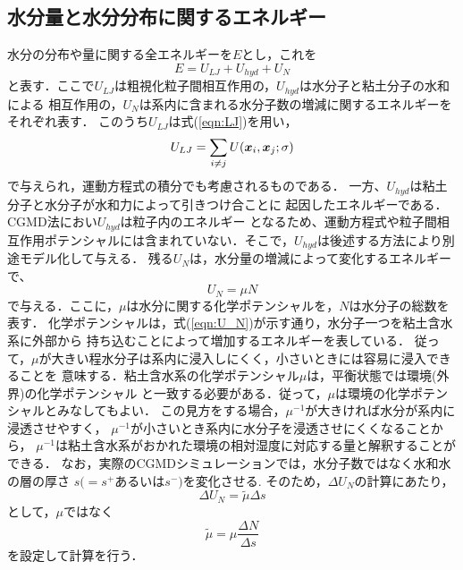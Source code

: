 \subsection{水分量と水分分布に関するエネルギー}
水分の分布や量に関する全エネルギーを$E$とし，これを
\begin{equation}
	E=U_{LJ} +U_{hyd} + U_N
	\label{eqn:}
\end{equation}
と表す．ここで$U_{LJ}$は粗視化粒子間相互作用の，$U_{hyd}$は水分子と粘土分子の水和による
相互作用の，$U_N$は系内に含まれる水分子数の増減に関するエネルギーをそれぞれ表す．
このうち$U_{LJ}$は式(\ref{eqn:LJ})を用い，
\begin{equation}
	U_{LJ}=\sum_{i\neq j} U(\mbox{\boldmath $x$}_i,\mbox{\boldmath $x$}_j;\sigma)
	\label{eqn:}
\end{equation}
で与えられ，運動方程式の積分でも考慮されるものである．
一方、$U_{hyd}$は粘土分子と水分子が水和力によって引きつけ合ことに
起因したエネルギーである．CGMD法におい$U_{hyd}$は粒子内のエネルギー
となるため、運動方程式や粒子間相互作用ポテンシャルには含まれていない．そこで，$U_{hyd}$は後述する方法により別途モデル化して与える．
残る$U_N$は，水分量の増減によって変化するエネルギーで、
\begin{equation}
	U_N=\mu N
	\label{eqn:U_N}
\end{equation}
で与える．ここに，$\mu$は水分に関する化学ポテンシャルを，$N$は水分子の総数を表す．
化学ポテンシャルは，式(\ref{eqn:U_N})が示す通り，水分子一つを粘土含水系に外部から
持ち込むことによって増加するエネルギーを表している．
従って，$\mu$が大きい程水分子は系内に浸入しにくく，小さいときには容易に浸入できることを
意味する．粘土含水系の化学ポテンシャル$\mu$は，平衡状態では環境(外界)の化学ポテンシャル
と一致する必要がある．従って，$\mu$は環境の化学ポテンシャルとみなしてもよい．
この見方をする場合，$\mu^{-1}$が大きければ水分が系内に浸透させやすく，
$\mu^{-1}$が小さいとき系内に水分子を浸透させにくくなることから，
$\mu^{-1}$は粘土含水系がおかれた環境の相対湿度に対応する量と解釈することができる．
なお，実際のCGMDシミュレーションでは，水分子数ではなく水和水の層の厚さ
$s(=s^{+}$あるいは$s^{-})$を変化させる. そのため，$\Delta U_N$の計算にあたり，
\begin{equation}
	\Delta U_N =\tilde \mu \Delta s
	\label{eqn:}
\end{equation}
として，$\mu$ではなく
\begin{equation}
	\tilde \mu =\mu \frac{\Delta N}{\Delta s}
	\label{eqn:}
\end{equation}
を設定して計算を行う．
